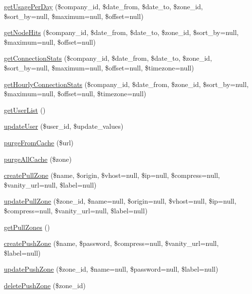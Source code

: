 \begin{DoxyCompactItemize}
\hyperlink{class_max_c_d_n_a0f0f34de0a9b9e8aee763a10620b0310}{getUsagePerDay} (\$company\_\-id, \$date\_\-from, \$date\_\-to, \$zone\_\-id, \$sort\_\-by=null, \$maximum=null, \$offset=null)
\item 
\hyperlink{class_max_c_d_n_a5edac3917b1fc456d9919a2b27954032}{getNodeHits} (\$company\_\-id, \$date\_\-from, \$date\_\-to, \$zone\_\-id, \$sort\_\-by=null, \$maximum=null, \$offset=null)
\item 
\hyperlink{class_max_c_d_n_a0ccdaad45884b8d37ec214a9fef96f69}{getConnectionStats} (\$company\_\-id, \$date\_\-from, \$date\_\-to, \$zone\_\-id, \$sort\_\-by=null, \$maximum=null, \$offset=null, \$timezone=null)
\item 
\hyperlink{class_max_c_d_n_a6a37fba9236e945837fdab2615463fd8}{getHourlyConnectionStats} (\$company\_\-id, \$date\_\-from, \$zone\_\-id, \$sort\_\-by=null, \$maximum=null, \$offset=null, \$timezone=null)
\item 
\hyperlink{class_max_c_d_n_aeb20dee182d29e6d339cab9682b4ff04}{getUserList} ()
\item 
\hyperlink{class_max_c_d_n_a1d86f2ee4963b6bfeb447979f58e8e0e}{updateUser} (\$user\_\-id, \$update\_\-values)
\item 
\hyperlink{class_max_c_d_n_a62a3e75f63fe9295ec761eaee62294fb}{purgeFromCache} (\$url)
\item 
\hyperlink{class_max_c_d_n_a1ffd352aec7f5cbd343401630382316b}{purgeAllCache} (\$zone)
\item 
\hyperlink{class_max_c_d_n_a842e2c679ffc3af1d78bc67f35edfc8b}{createPullZone} (\$name, \$origin, \$vhost=null, \$ip=null, \$compress=null, \$vanity\_\-url=null, \$label=null)
\item 
\hyperlink{class_max_c_d_n_ad95bc411959f49b988bed017381a6103}{updatePullZone} (\$zone\_\-id, \$name=null, \$origin=null, \$vhost=null, \$ip=null, \$compress=null, \$vanity\_\-url=null, \$label=null)
\item 
\hyperlink{class_max_c_d_n_af25dffec4a45683331d76e16ac82f125}{getPullZones} ()
\item 
\hyperlink{class_max_c_d_n_a56f74befea49b5aad3ce999b0b700cd0}{createPushZone} (\$name, \$password, \$compress=null, \$vanity\_\-url=null, \$label=null)
\item 
\hyperlink{class_max_c_d_n_a6f76399ae6628212637357d101c3a37f}{updatePushZone} (\$zone\_\-id, \$name=null, \$password=null, \$label=null)
\item 
\hyperlink{class_max_c_d_n_a020946e4c4bd99908cf439113569ef2b}{deletePushZone} (\$zone\_\-id)
\item 

\end{DoxyCompactItemize}
